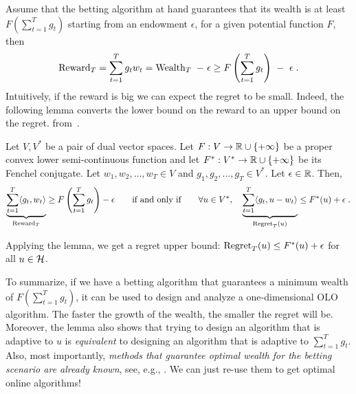 Assume that the betting algorithm at hand guarantees that its wealth is at
least $F(\sum_{t=1}^T g_t)$ starting from an endowment $\epsilon$, for a given potential function $F$, then
\vspace{-.1cm}
\begin{equation}
\label{equation:one-dimensional-olo-reward-lower-bound}
\Reward_T
= \sum_{t=1}^T g_t w_t
= \Wealth_T \ - \ \epsilon \ge F\left(\sum_{t=1}^T g_t \right) \ - \ \epsilon \; .
\end{equation}
Intuitively, if the reward is big  we can expect the
regret to be small.
Indeed, the following lemma converts the lower bound on the reward to an upper bound on the regret.
from~\cite{McMahan-Orabona-2014}.
\begin{lemma}
\label{lemma:reward-regret}
Let $V,V^*$ be a pair of dual vector spaces. Let $F:V \to \mathbb{R} \cup \{+\infty\}$
be a proper convex lower semi-continuous function and let $F^*:V^* \to \mathbb{R} \cup
\{+\infty\}$ be its Fenchel conjugate. Let $w_1, w_2, \dots, w_T \in V$ and
$g_1, g_2, \dots, g_T \in V^*$. Let $\epsilon \in \mathbb{R}$. Then,
\[
\underbrace{\sum_{t=1}^T \langle g_t, w_t \rangle}_{\operatorname{Reward}_T} \ge F\left( \sum_{t=1}^T g_t \right) -\epsilon
\qquad \text{if and only if} \qquad
\forall u \in V^*, \quad
\underbrace{\sum_{t=1}^T \langle g_t, u - w_t\rangle}_{\operatorname{Regret}_T(u)} \le F^*(u) + \epsilon\; .
\]
\end{lemma}
\vspace{-.1cm}
Applying the lemma, we get a regret upper bound:
$\operatorname{Regret}_T(u) \le F^*(u) + \epsilon$ for all $u \in \mathcal{H}$.

To summarize, if we have a betting algorithm that guarantees a minimum wealth
of $F(\sum_{t=1}^T g_t)$, it can be used to design and analyze a
one-dimensional \ac{OLO} algorithm. The faster the growth of the wealth, the
smaller the regret will be.  Moreover, the lemma also shows that trying to
design an algorithm that is adaptive to $u$ is \emph{equivalent} to designing
an algorithm that is adaptive to $\sum_{t=1}^T g_t$.  Also, most importantly,
\emph{methods that guarantee optimal wealth for the betting scenario are
already known}, see, e.g., \cite[Chapter 9]{Cesa-Bianchi-Lugosi-2006}. We can
just re-use them to get optimal online algorithms!
